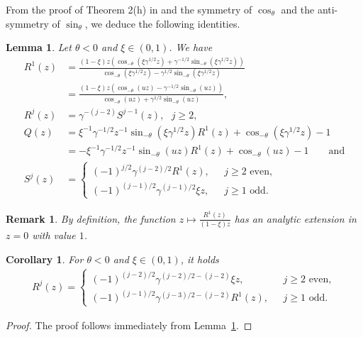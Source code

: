 \documentclass[10pt,a4paper]{amsart}
\newcommand{\Q}{\mathbb{Q}} %
\newcommand{\R}{\mathbb{R}} %
\newcommand{\1}{\mathds{1}}
\newtheorem{Lemma}[definition]{Lemma}
\newtheorem{Corollary}[definition]{Corollary}
\newtheorem{Remark}{Remark}
\begin{document}
 From the proof of Theorem 2(h) in \cite{AR} and the symmetry of $\cos_\theta$ and the anti-symmetry of $\sin_\theta$, we deduce the following identities.
\begin{Lemma}\label{gf_other_neg_theta}
   Let $\theta<0$ and $\xi\in(0,1)$. We have
    \begin{align*}
        R^1(z)&=\frac{(1-\xi)z(\cos_{-\theta}(\xi\gamma^{1/2}z)+\gamma^{-1/2}\sin_{-\theta}(\xi\gamma^{1/2}z))}{\cos_{-\theta}(\xi\gamma^{1/2}z)-\gamma^{1/2}\sin_{-\theta}(\xi\gamma^{1/2}z)}
        \\&=\frac{(1-\xi)z(\cos_{-\theta}(uz)-\gamma^{-1/2}\sin_{-\theta}(uz))}{\cos_{-\theta}(uz)+\gamma^{1/2}\sin_{-\theta}(uz)}, %
        \\R^j(z)&=\gamma^{-(j-2)}S^{j-1}(z),~~~j\ge2,
        \\Q(z)&=\xi^{-1}\gamma^{-1/2}z^{-1}\sin_{-\theta}(\xi\gamma^{1/2}z) R^1(z)+\cos_{-\theta}(\xi\gamma^{1/2}z)-1
        \\&=-\xi^{-1}\gamma^{-1/2}z^{-1}\sin_{-\theta}(uz) R^1(z)+\cos_{-\theta}(uz)-1\qquad \text{and}
\\
    S^j(z)& =\begin{cases}
        (-1)^{j/2}\gamma^{(j-2)/2}R^1(z),~~~&j\ge 2\text{ even},
        \\(-1)^{(j-1)/2}\gamma^{(j-1)/2}\xi z,~~~&j\ge 1\text{ odd}.
    \end{cases}
\end{align*}
\end{Lemma}
\begin{Remark}\label{R1_analytic_0}
    By definition, the function $z\mapsto \frac{R^1(z)}{(1-\xi) z}$ has an analytic extension in $z=0$ with value $1$.
\end{Remark}
\begin{Corollary}\label{Rj_neg_theta}
  For $\theta<0$ and $\xi\in(0,1)$, it holds
    \begin{align*}
        R^j(z)=\begin{cases}
        (-1)^{(j-2)/2}\gamma^{(j-2)/2-(j-2)}\xi z,~~~&j\ge 2\text{ even},
        \\(-1)^{(j-1)/2}\gamma^{(j-3)/2-(j-2)}R^1(z),~~~&j\ge 1\text{ odd}.
        \end{cases}
    \end{align*}
\end{Corollary}
\begin{proof}
    The proof follows immediately from Lemma~\ref{gf_other_neg_theta}.
\end{proof}
\end{document}
